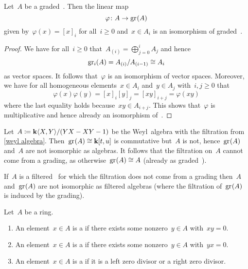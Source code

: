 \begin{lemma}
  Let~$A$ be a graded~{\algebra{$\kf$}}.
  Then the linear map
  \[
    \varphi 
    \colon
    A
    \to
    \gr(A)
  \]
  given by~$\varphi(x) = [x]_i$ for all~$i \geq 0$ and~$x \in A_i$ is an isomorphism of graded~{\algebras{$\kf$}}.
\end{lemma}


\begin{proof}
  We have for all~$i \geq 0$ that~$A_{(i)} = \bigoplus_{j=0}^i A_j$ and hence
  \[
    \gr[i](A)
    =
    A_{(i)} / A_{(i-1)}
    \cong
    A_i
  \]
  as vector spaces.
  It follows that~$\varphi$ is an isomorphism of vector spaces.
  Moreover, we have for all homogeneous elements~$x \in A_i$ and~$y \in A_j$ with~$i, j \geq 0$ that
  \[
    \varphi(x) \varphi(y)
    =
    [x]_i [y]_j
    =
    [xy]_{i+j}
    =
    \varphi(xy)
  \]
  where the last equality holds because~$xy \in A_{i+j}$.
  This shows that~$\varphi$ is multiplicative and hence already an isomorphism of~{\algebras{$\kf$}}.
\end{proof}


\begin{example}
  Let~$A \coloneqq \mathbf{k}\langle X, Y\rangle/(YX - XY - 1)$ be the Weyl~algebra with the filtration from \cref{weyl algebra}.
  Then~$\gr(A) \cong \kf[t,u]$ is commutative but~$A$ is not, hence~$\gr(A)$ and~$A$ are not isomorphic as algebras.
  It follows that the filtration on~$A$ cannot come from a grading, as otherwise~$\gr(A) \cong A$ (already as graded~{\algebras{$\kf$}}).
\end{example}


\begin{warning}
  If~$A$ is a filtered~{\algebra{$\kf$}} for which the filtration does not come from a grading then~$A$ and~$\gr(A)$ are not isomorphic as filtered algebras (where the filtration of~$\gr(A)$ is induced by the grading).
\end{warning}


\begin{definition}
  Let~$A$ be a ring.
  \begin{enumerate}
    \item
      An element~$x \in A$ is a  if there exists some nonzero~$y \in A$ with~$xy = 0$.
    \item
      An element~$x \in A$ is a  if there exists some nonzero~$y \in A$ with~$yx = 0$.
    \item
      An element~$x \in A$ is a  if it is a left zero divisor or a right zero divisor.
  \end{enumerate}
\end{definition}


